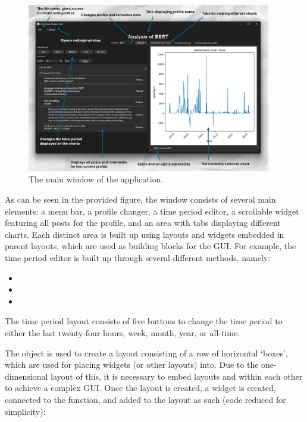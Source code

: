     \begin{figure}[h]
    \centering
        \includegraphics[width=0.95\textwidth]{figures/main-window-labels.png}
    \caption{The main window of the application.}
    \end{figure}

    As can be seen in the provided figure, the window consists of several main elements: a menu bar, a profile changer, a time period editor, a scrollable widget featuring all posts for the profile, and an area with tabs displaying different charts. Each distinct area is built up using layouts and widgets embedded in parent layouts, which are used as building blocks for the GUI. For example, the time period editor is built up through several different  methods, namely: 

    \begin{itemize}
        \item {}
        \item {}
        \item {}
    \end{itemize}

    The time period layout consists of five buttons to change the time period to either the last twenty-four hours, week, month, year, or all-time.

    The  object  is used to create a layout consisting of a row of horizontal `boxes', which are used for placing widgets (or other layouts) into. Due to the one-dimensional layout of this, it is necessary to embed layouts  and  within each other to achieve a complex GUI. Once the layout is created, a  widget is created, connected to the  function, and added to the layout as such (code reduced for simplicity):

